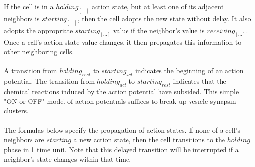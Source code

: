 \documentclass{acm_proc_article-sp}
\begin{document}
If the cell is in a $holding_{[...]}$ action state, but at least one of its 
adjacent neighbors is $starting_{[...]}$, then the cell
adopts the new state without delay.  It also adopts the appropriate 
$starting_{[...]}$ value 
if the neighbor's value is $receiving_{[...]}$. Once
a cell's action state value changes, it then propagates this information to other
neighboring cells.\\
\\
A transition from $holding_{rest}$ to 
$starting_{act}$ indicates the beginning of an action potential.  The
transition from $holding_{act}$ to $starting_{rest}$ indicates that 
the chemical reactions induced by the action potential have subsided.
This simple "ON-or-OFF" model of action potentials suffices to break
up vesicle-synapsin clusters. \\
\\
The formulas below specify the propagation of action states.  If none
of a cell's neighbors are $starting$ a new action state, then the cell
transitions to the $holding$ phase in 1 time unit.  Note that this
delayed transition will be interrupted if a neighbor's state changes
within that time.
\end{document}
